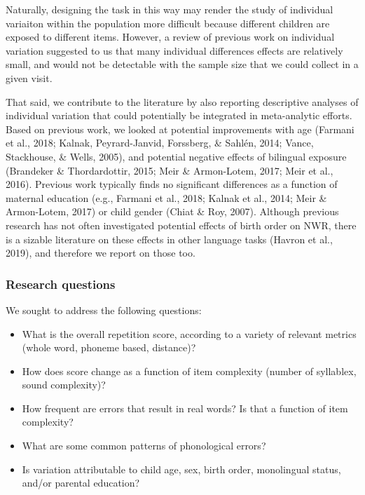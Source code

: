 \documentclass[english,,man]{apa6}
\providecommand{\tightlist}{%
  \setlength{\itemsep}{0pt}\setlength{\parskip}{0pt}}
\begin{document}
Naturally, designing the task in this way may render the study of individual variaiton within the population more difficult because different children are exposed to different items. However, a review of previous work on individual variation suggested to us that many individual differences effects are relatively small, and would not be detectable with the sample size that we could collect in a given visit.

That said, we contribute to the literature by also reporting descriptive analyses of individual variation that could potentially be integrated in meta-analytic efforts. Based on previous work, we looked at potential improvements with age (Farmani et al., 2018; Kalnak, Peyrard-Janvid, Forssberg, \& Sahlén, 2014; Vance, Stackhouse, \& Wells, 2005), and potential negative effects of bilingual exposure (Brandeker \& Thordardottir, 2015; Meir \& Armon-Lotem, 2017; Meir et al., 2016). Previous work typically finds no significant differences as a function of maternal education (e.g., Farmani et al., 2018; Kalnak et al., 2014; Meir \& Armon-Lotem, 2017) or child gender (Chiat \& Roy, 2007). Although previous research has not often investigated potential effects of birth order on NWR, there is a sizable literature on these effects in other language tasks (Havron et al., 2019), and therefore we report on those too.

\hypertarget{research-questions}{%
\subsubsection{Research questions}\label{research-questions}}

We sought to address the following questions:

\begin{itemize}
\tightlist
\item
  What is the overall repetition score, according to a variety of relevant metrics (whole word, phoneme based, distance)?
\item
  How does score change as a function of item complexity (number of syllablex, sound complexity)?
\item
  How frequent are errors that result in real words? Is that a function of item complexity?
\item
  What are some common patterns of phonological errors?
\item
  Is variation attributable to child age, sex, birth order, monolingual status, and/or parental education?
\end{itemize}
\end{document}
